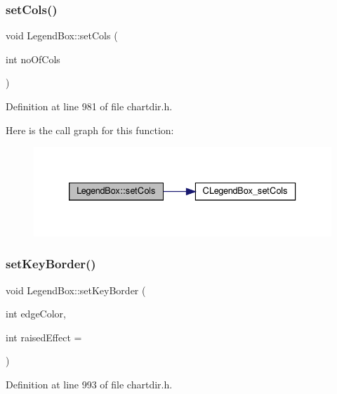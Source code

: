 \subsubsection{\texorpdfstring{set\+Cols()}{setCols()}}
{\footnotesize\ttfamily void Legend\+Box\+::set\+Cols (\begin{DoxyParamCaption}\item[{int}]{no\+Of\+Cols }\end{DoxyParamCaption})\hspace{0.3cm}{\ttfamily [inline]}}



Definition at line 981 of file chartdir.\+h.

Here is the call graph for this function\+:
\nopagebreak
\begin{figure}[H]
\begin{center}
\leavevmode
\includegraphics[width=333pt]{class_legend_box_a5220b13f9c7b5f3b9d0d8eaa9cfe6c25_cgraph}
\end{center}
\end{figure}
\mbox{\label{class_legend_box_ab91ffd981089078d99a2d889b7a558d5}} 
\subsubsection{\texorpdfstring{set\+Key\+Border()}{setKeyBorder()}}
{\footnotesize\ttfamily void Legend\+Box\+::set\+Key\+Border (\begin{DoxyParamCaption}\item[{int}]{edge\+Color,  }\item[{int}]{raised\+Effect = {} }\end{DoxyParamCaption})\hspace{0.3cm}{\ttfamily [inline]}}



Definition at line 993 of file chartdir.\+h.

